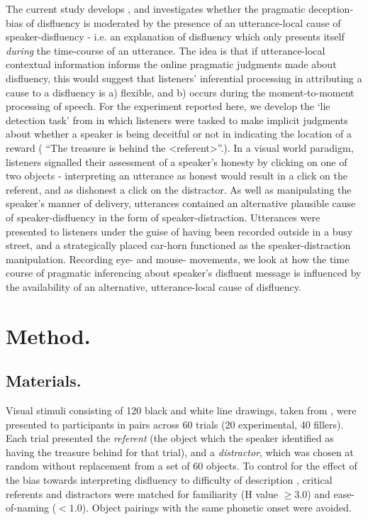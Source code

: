 \documentclass[man]{apa6}
\begin{document}
The current study develops \citet{Loy2016}, and investigates whether the pragmatic deception-bias of disfluency is moderated by the presence of an utterance-local cause of speaker-disfluency - i.e. an explanation of disfluency which only presents itself \textit{during} the time-course of an utterance. 
The idea is that if utterance-local contextual information informs the online pragmatic judgments made about disfluency, this would suggest that listeners' inferential processing in attributing a cause to a disfluency is a) flexible, and b) occurs during the moment-to-moment processing of speech. 
For the experiment reported here, we develop the `lie detection task' from \citet{Loy2016} in which listeners were tasked to make implicit judgments about whether a speaker is being deceitful or not in indicating the location of a reward ( ``The treasure is behind the \textless referent\textgreater ''.). 
In a visual world paradigm, listeners signalled their assessment of a speaker's honesty by clicking on one of two objects - interpreting an utterance as honest would result in a click on the referent, and as dishonest a click on the distractor. 
As well as manipulating the speaker's manner of delivery, utterances contained an alternative plausible cause of speaker-disfluency in the form of speaker-distraction. 
Utterances were presented to listeners under the guise of having been recorded outside in a busy street, and a strategically placed car-horn functioned as the speaker-distraction manipulation. 
Recording eye- and mouse- movements, we look at how the time course of pragmatic inferencing about speaker's disfluent message is influenced by the availability of an alternative, utterance-local cause of disfluency.



\section{Method.}
\subsection{Materials.}
Visual stimuli consisting of 120 black and white line drawings, taken from \citet{Snodgrass1980}, were presented to participants in pairs across 60 trials (20 experimental, 40 fillers). 
Each trial presented the \textit{referent} (the object which the speaker identified as having the treasure behind for that trial), and a \textit{distractor}, which was chosen at random without replacement from a set of 60 objects. 
To control for the effect of the bias towards interpreting disfluency to difficulty of description \citep{Arnold2007}, critical referents and distractors were matched for familiarity (H value $\ge 3.0$) and ease-of-naming ($<1.0$). 
Object pairings with the same phonetic onset were avoided. \\
\end{document}
